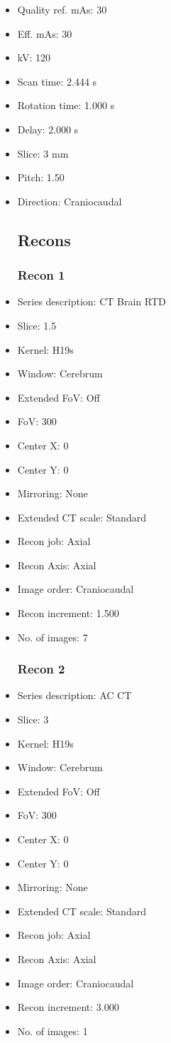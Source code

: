\documentclass[12pt]{article}
\begin{document}
\begin{itemize}[noitemsep]
\subsection{Scan}
\item Quality ref. mAs: 30\item Eff. mAs: 30\item kV: 120\item Scan time: 2.444 s\item Rotation time: 1.000 s\item Delay: 2.000 s\item Slice: 3 mm\item Pitch: 1.50\item Direction: Craniocaudal\subsection{Recons}

\subsubsection{Recon 1}
\item Series description: CT Brain RTD
\item Slice: 1.5
\item Kernel: H19s
\item Window: Cerebrum
\item Extended FoV: Off
\item FoV: 300
\item Center X: 0
\item Center Y: 0
\item Mirroring: None
\item Extended CT scale: Standard
\item Recon job: Axial
\item Recon Axis: Axial
\item Image order: Craniocaudal
\item Recon increment: 1.500
\item No. of images: 7
\subsubsection{Recon 2}
\item Series description: AC CT
\item Slice: 3
\item Kernel: H19s
\item Window: Cerebrum
\item Extended FoV: Off
\item FoV: 300
\item Center X: 0
\item Center Y: 0
\item Mirroring: None
\item Extended CT scale: Standard
\item Recon job: Axial
\item Recon Axis: Axial
\item Image order: Craniocaudal
\item Recon increment: 3.000
\item No. of images: 1
\end{itemize}
\end{document}
